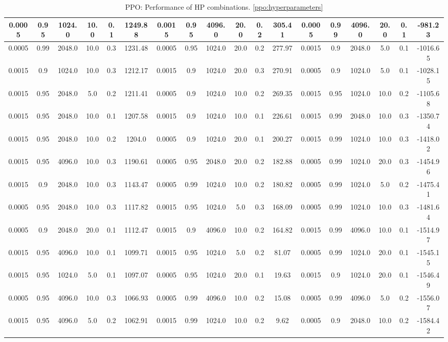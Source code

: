 \begin{table}[h]
{\begin{tabular}{|c|c|c|c|c|c||c|c|c|c|c|c||c|c|c|c|c|c|}
    \hline
    0.0005 & 0.95 & 1024.0 & 10.0 & 0.1 & 1249.88 & 0.0015 & 0.95 & 4096.0 & 20.0 & 0.2 & 305.41 & 0.0005 & 0.99 & 4096.0 & 20.0 & 0.1 & -981.23 \\
    \hline
    0.0005 & 0.99 & 2048.0 & 10.0 & 0.3 & 1231.48 & 0.0005 & 0.95 & 1024.0 & 20.0 & 0.2 & 277.97 & 0.0015 & 0.9 & 2048.0 & 5.0 & 0.1 & -1016.65 \\
    \hline
    0.0015 & 0.9 & 1024.0 & 10.0 & 0.3 & 1212.17 & 0.0015 & 0.9 & 1024.0 & 20.0 & 0.3 & 270.91 & 0.0005 & 0.9 & 1024.0 & 5.0 & 0.1 & -1028.15 \\
    \hline
    0.0015 & 0.95 & 2048.0 & 5.0 & 0.2 & 1211.41 & 0.0005 & 0.9 & 1024.0 & 10.0 & 0.2 & 269.35 & 0.0015 & 0.95 & 1024.0 & 10.0 & 0.2 & -1105.68 \\
    \hline
    0.0015 & 0.95 & 2048.0 & 10.0 & 0.1 & 1207.58 & 0.0015 & 0.9 & 1024.0 & 10.0 & 0.1 & 226.61 & 0.0015 & 0.99 & 2048.0 & 10.0 & 0.3 & -1350.74 \\
    \hline
    0.0015 & 0.95 & 2048.0 & 10.0 & 0.2 & 1204.0 & 0.0005 & 0.9 & 1024.0 & 20.0 & 0.1 & 200.27 & 0.0015 & 0.99 & 1024.0 & 10.0 & 0.3 & -1418.02 \\
    \hline
    0.0015 & 0.95 & 4096.0 & 10.0 & 0.3 & 1190.61 & 0.0005 & 0.95 & 2048.0 & 20.0 & 0.2 & 182.88 & 0.0005 & 0.99 & 1024.0 & 20.0 & 0.3 & -1454.96 \\
    \hline
    0.0015 & 0.9 & 2048.0 & 10.0 & 0.3 & 1143.47 & 0.0005 & 0.99 & 1024.0 & 10.0 & 0.2 & 180.82 & 0.0005 & 0.99 & 1024.0 & 5.0 & 0.2 & -1475.41 \\
    \hline
    0.0005 & 0.95 & 2048.0 & 10.0 & 0.3 & 1117.82 & 0.0015 & 0.95 & 1024.0 & 5.0 & 0.3 & 168.09 & 0.0005 & 0.99 & 1024.0 & 10.0 & 0.3 & -1481.64 \\
    \hline
    0.0005 & 0.9 & 2048.0 & 20.0 & 0.1 & 1112.47 & 0.0015 & 0.9 & 4096.0 & 10.0 & 0.2 & 164.82 & 0.0015 & 0.99 & 4096.0 & 10.0 & 0.1 & -1514.97 \\
    \hline
    0.0015 & 0.95 & 4096.0 & 10.0 & 0.1 & 1099.71 & 0.0015 & 0.95 & 1024.0 & 5.0 & 0.2 & 81.07 & 0.0005 & 0.99 & 1024.0 & 20.0 & 0.1 & -1545.15 \\
    \hline
    0.0015 & 0.95 & 1024.0 & 5.0 & 0.1 & 1097.07 & 0.0005 & 0.95 & 1024.0 & 20.0 & 0.1 & 19.63 & 0.0015 & 0.9 & 1024.0 & 20.0 & 0.1 & -1546.49 \\
    \hline
    0.0005 & 0.95 & 4096.0 & 10.0 & 0.3 & 1066.93 & 0.0005 & 0.99 & 4096.0 & 10.0 & 0.2 & 15.08 & 0.0005 & 0.99 & 4096.0 & 5.0 & 0.2 & -1556.07 \\
    \hline
    0.0015 & 0.95 & 4096.0 & 5.0 & 0.2 & 1062.91 & 0.0015 & 0.99 & 1024.0 & 10.0 & 0.2 & 9.62 & 0.0005 & 0.9 & 2048.0 & 10.0 & 0.2 & -1584.42 \\
    \hline
    \end{tabular}
    }
    \caption{PPO: Performance of HP combinations. \ref{ppo:hyperparameters}}
    \label{tab:config_scores}
\end{table}
    